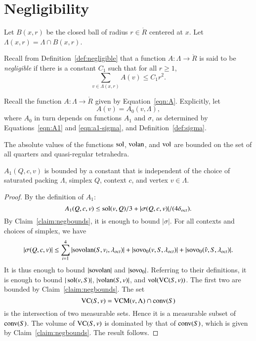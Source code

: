 \section{Negligibility} \label{sec:negligible}

Let $B(x,r)$ be the closed ball of radius $r\in\ring{R}$ centered
at $x$.  Let $\Lambda(x,r)=\Lambda\cap B(x,r)$.

Recall from Definition~\ref{def:negligible} that a function
$A:\Lambda\to\ring{R}$ is said to be {\it negligible} if there is a
constant $C_1$ such that for all $r\ge1$,
   $$\sum_{v\in\Lambda(x,r) } A(v) \le C_1 r^2.$$
%


Recall the function $A: \Lambda\to\ring{R}$ given by
Equation~\ref{eqn:A}.  Explicitly, let
   $$A(v) = A_0(v,\Lambda),$$
where $A_0$ in turn depends on functions $A_1$ and $\sigma$, as
determined by Equations~\ref{eqn:A1} and \ref{eqn:a1-sigma}, and
Definition~\ref{def:sigma}.

\begin{claim}\label{claim:negbounds}
    The absolute values of the functions $\operatorname{sol}$, ${\operatorname{volan}}$, and ${\operatorname{vol}}$
are bounded on the set of all quarters and
    quasi-regular tetrahedra.
\end{claim}


\begin{lemma}\label{lemma:A1bound}  $A_1(Q,c,v)$ is bounded by a constant that is
independent of the choice of saturated packing $\Lambda$, simplex
$Q$, context $c$, and vertex $v\in\Lambda$.
\end{lemma}

\begin{proof} By the definition of $A_1$:
    $$
    A_1(Q,c,v) \le \operatorname{sol}(v,Q)/3 + |\sigma(Q,c,v)|/(4\delta_{oct}).
    $$
By Claim~\ref{claim:negbounds}, it is enough to bound $|\sigma|$.
For all contexts and choices of simplex, we have
    $$|\sigma(Q,c,v)|\le \sum_{i=1}^4 |{\operatorname{sovolan}}(S,v_i,\lambda_{oct})| +
        |{\operatorname{sovo}}_0(v,S,\lambda_{oct})| 
      + |{\operatorname{sovo}}_0(\hat v,S,\lambda_{oct})|.
    $$
It is thus enough to bound $|{\operatorname{sovolan}}|$ and $|{\operatorname{sovo}}_0|$.  Referring
to their definitions, it is enough to bound $|\operatorname{sol}(v,S)|$,
$|{\operatorname{volan}}(S,v)|$, and ${\operatorname{vol}}({\operatorname{VC}}(S,v))$. The first two
are bounded by Claim~\ref{claim:negbounds}.  The set
    $${\operatorname{VC}}(S,v) = {\operatorname{VCM}}(v,\Lambda)\cap {\operatorname{conv}}(S)$$
is the intersection of two measurable sets.  Hence it is a
measurable subset of ${\operatorname{conv}}(S)$.  The volume of ${\operatorname{VC}}(S,v)$ is
dominated by that of ${\operatorname{conv}}(S)$, which is given by
Claim~\ref{claim:negbounds}.  The result follows.
\end{proof}

